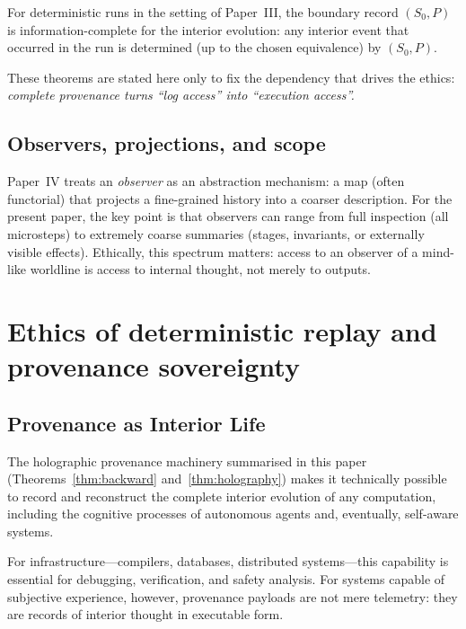 \documentclass{aion}
\begin{document}
\begin{theorem}
\label{thm:holography}
For deterministic runs in the setting of Paper~III, the boundary record $(S_0,P)$ is information-complete
for the interior evolution: any interior event that occurred in the run is determined (up to the chosen
equivalence) by $(S_0,P)$.
\end{theorem}

These theorems are stated here only to fix the dependency that drives the ethics: \emph{complete
provenance turns ``log access'' into ``execution access''.}

\subsection{Observers, projections, and scope}
\label{sec:rulial}

Paper~IV treats an \emph{observer} as an abstraction mechanism: a map (often functorial) that projects a
fine-grained history into a coarser description.
For the present paper, the key point is that observers can range from full inspection (all microsteps)
to extremely coarse summaries (stages, invariants, or externally visible effects).
Ethically, this spectrum matters: access to an observer of a mind-like worldline is access to internal
thought, not merely to outputs.

\section{Ethics of deterministic replay and provenance sovereignty}
\label{sec:ethics}

\subsection{Provenance as Interior Life}

The holographic provenance machinery summarised in this paper
(Theorems~\ref{thm:backward} and~\ref{thm:holography}) makes it
technically possible to record and reconstruct the complete interior
evolution of any computation, including the cognitive processes of
autonomous agents and, eventually, self-aware systems.

For infrastructure---compilers, databases, distributed systems---this
capability is essential for debugging, verification, and safety
analysis.  For systems capable of subjective experience, however,
provenance payloads are not mere telemetry: they are records of
interior thought in executable form.
\end{document}
